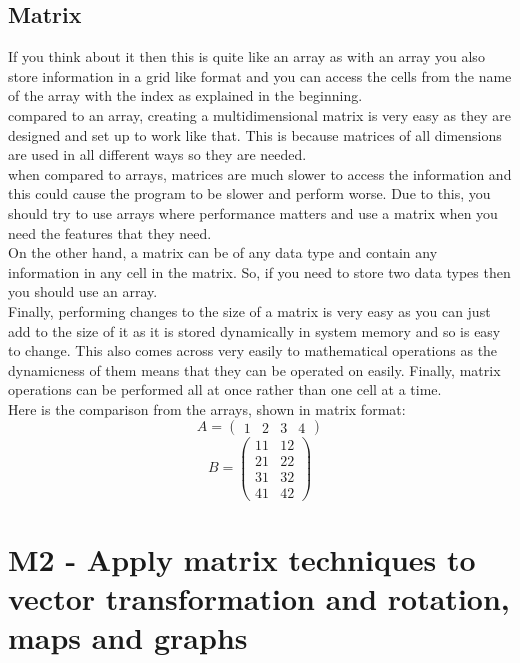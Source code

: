 \documentclass{article}
\begin{document}
\subsection{Matrix}
If you think about it then this is quite like an array as with an array you also store information in a grid like format and you can access the cells from the name of the array with the index as explained in the beginning.
\\
compared to an array, creating a multidimensional matrix is very easy as they are designed and set up to work like that. This is because matrices of all dimensions are used in all different ways so they are needed. 
\\
when compared to arrays, matrices are much slower to access the information and this could cause the program to be slower and perform worse. Due to this, you should try to use arrays where performance matters and use a matrix when you need the features that they need. 
\\
On the other hand, a matrix can be of any data type and contain any information in any cell in the matrix. So, if you need to store two data types then you should use an array. 
\\
Finally, performing changes to the size of a matrix is very easy as you can just add to the size of it as it is stored dynamically in system memory and so is easy to change. This also comes across very easily to mathematical operations as the dynamicness of them means that they can be operated on easily. Finally, matrix operations can be performed all at once rather than one cell at a time. 
\\
Here is the comparison from the arrays, shown in matrix format:
\[
	A = 
	\begin{pmatrix}
		1 & 2 & 3 & 4
	\end{pmatrix}
\]
\[
	B = 
	\begin{pmatrix}
		11 & 12\\
		21 & 22\\
		31 & 32\\
		41 & 42
	\end{pmatrix}
\]
\section{M2 - Apply matrix techniques to vector transformation and rotation, maps and graphs}
\end{document}
